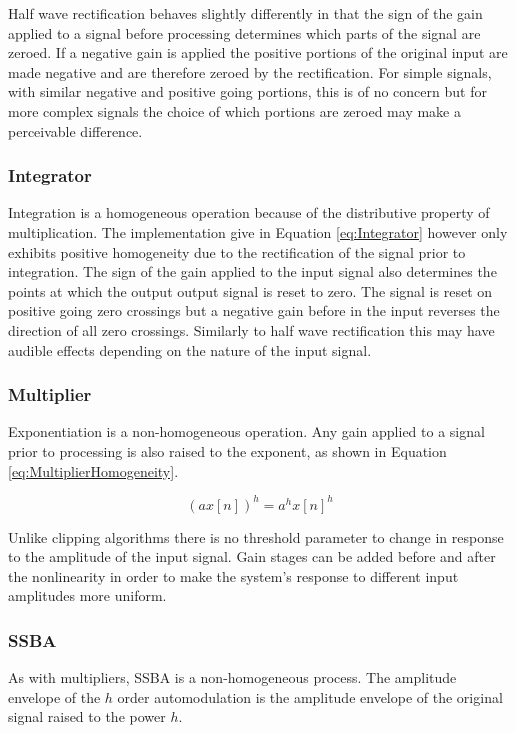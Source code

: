 			Half wave rectification behaves slightly differently in that the sign of the gain applied to a
			signal before processing determines which parts of the signal are zeroed. If a negative gain is
			applied the positive portions of the original input are made negative and are therefore zeroed by
			the rectification. For simple signals, with similar negative and positive going portions, this is of
			no concern but for more complex signals the choice of which portions are zeroed may make a
			perceivable difference.

		\subsubsection*{Integrator}
			Integration is a homogeneous operation because of the distributive property of multiplication. The
			implementation give in Equation \ref{eq:Integrator} however only exhibits positive homogeneity due
			to the rectification of the signal prior to integration. The sign of the gain applied to the
			input signal also determines the points at which the output output signal is reset to zero.
			The signal is reset on positive going zero crossings but a negative gain before in the input
			reverses the direction of all zero crossings. Similarly to half wave rectification this may have
			audible effects depending on the nature of the input signal.

		\subsubsection*{Multiplier}
			Exponentiation is a non-homogeneous operation. Any gain applied to a signal prior to processing is
			also raised to the exponent, as shown in Equation \ref{eq:MultiplierHomogeneity}.

			\begin{equation}
				(ax[n])^{h} = a^{h}x[n]^{h}
				\label{eq:MultiplierHomogeneity}
			\end{equation}

			Unlike clipping algorithms there is no threshold parameter to change in response to the amplitude of
			the input signal. Gain stages can be added before and after the nonlinearity in order to make the
			system's response to different input amplitudes more uniform.

		\subsubsection*{SSBA}
			As with multipliers, SSBA is a non-homogeneous process. The amplitude envelope of the $h$
			order automodulation is the amplitude envelope of the original signal raised to the power $h$. 

